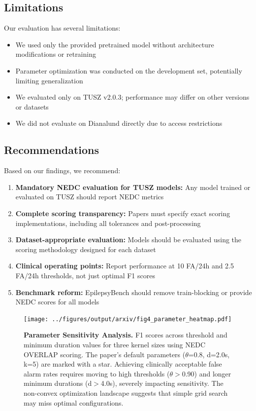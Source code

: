 \documentclass[10pt,a4paper]{article}
\begin{document}
\subsection{Limitations}

Our evaluation has several limitations:
\begin{itemize}
    \item We used only the provided pretrained model without architecture modifications or retraining
    \item Parameter optimization was conducted on the development set, potentially limiting generalization
    \item We evaluated only on TUSZ v2.0.3; performance may differ on other versions or datasets
    \item We did not evaluate on Dianalund directly due to access restrictions
\end{itemize}

\subsection{Recommendations}

Based on our findings, we recommend:

\begin{enumerate}
    \item \textbf{Mandatory NEDC evaluation for TUSZ models:} Any model trained or evaluated on TUSZ should report NEDC metrics
    \item \textbf{Complete scoring transparency:} Papers must specify exact scoring implementations, including all tolerances and post-processing
    \item \textbf{Dataset-appropriate evaluation:} Models should be evaluated using the scoring methodology designed for each dataset
    \item \textbf{Clinical operating points:} Report performance at 10 FA/24h and 2.5 FA/24h thresholds, not just optimal F1 scores
    \item \textbf{Benchmark reform:} EpilepsyBench should remove train-blocking or provide NEDC scores for all models
\end{enumerate}

\begin{figure}[t]
    \centering
    \texttt{[image: ../figures/output/arxiv/fig4\_parameter\_heatmap.pdf]}
    \caption{\textbf{Parameter Sensitivity Analysis.} F1 scores across threshold and minimum duration values for three kernel sizes using NEDC OVERLAP scoring. The paper's default parameters ($\theta$=0.8, d=2.0s, k=5) are marked with a star. Achieving clinically acceptable false alarm rates requires moving to high thresholds ($\theta$$>$0.90) and longer minimum durations (d$>$4.0s), severely impacting sensitivity. The non-convex optimization landscape suggests that simple grid search may miss optimal configurations.}
    \label{fig:parameter_heatmap}
\end{figure}
\end{document}
